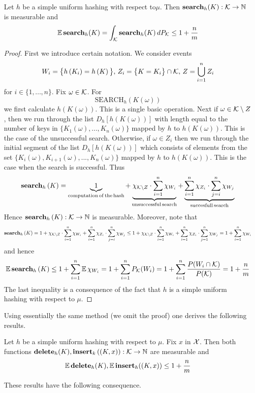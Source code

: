 \begin{theorem}\label{theorem:simple_uniform_hashing_expected_cost_for_search}
Let $h$ be a simple uniform hashing with respect to$\mu$. Then $\mathbf{search}_h(K):{\mathcal K}\rightarrow {\mathbb N}$ is measurable and
$$\mathbb{E}\,\mathbf{search}_h(K) = \int_{{\mathcal K}}\mathbf{search}_h(K)\,dP_{{\mathcal K}} \leq 1 + \frac{n}{m}$$
\end{theorem}
\begin{proof}
First we introduce certain notation. We consider events
$$W_{i} = \big\{h\left(K_i\right) = h\left(K\right)\big\},\,Z_i = \big\{K = K_i\big\}\cap {\mathcal K},\,Z = \bigcup_{i=1}^nZ_i$$
for $i\in \{1,...,n\}$. Fix $\omega \in {\mathcal K}$. For 
$$\mathrm{SEARCH}_h(K(\omega))$$
we first calculate $h(K(\omega))$. This is a single basic operation. Next if $\omega \in {\mathcal K}\setminus Z$, then we run through the list $D_h[h(K(\omega))]$ with length equal to the number of keys in $\big\{K_1(\omega),...,K_n(\omega)\big\}$ mapped by $h$ to $h(K(\omega))$. This is the case of the unsuccessful search. Otherwise, if $\omega \in Z_i$ then we run through the initial segment of the list $D_h[h(K(\omega))]$ which consists of elements from the set $\big\{K_i(\omega),K_{i+1}(\omega),...,K_n(\omega)\big\}$ mapped by $h$ to $h(K(\omega))$. This is the case when the search is successful. Thus
$$\mathbf{search}_h\left(K\right) = \underbrace{1}_{\mathrm{computation\,of\,the\,hash}} + \underbrace{\chi_{{\mathcal K}\setminus Z}\cdot\sum_{i=1}^n \chi_{W_{i}}}_{\mathrm{unsuccessful\,search}} + \underbrace{\sum_{i=1}^n\chi_{Z_i}\cdot\sum_{j = i}^n \chi_{W_{j}}}_{\mathrm{succesfull\,search}}$$
Hence $\mathbf{search}_h\left(K\right):{\mathcal K}\rightarrow {\mathbb N}$ is measurable. Moreover, note that
$$\mathbf{search}_h\left(K\right) = 1 + \chi_{{\mathcal K}\setminus Z}\cdot \sum_{i=1}^n \chi_{W_{i}} + \sum_{i=1}^n\chi_{Z_i}\cdot\sum_{j = i}^n \chi_{W_{j}} \leq 1 + \chi_{{\mathcal K}\setminus Z}\cdot \sum_{i=1}^n \chi_{W_{i}} + \sum_{i=1}^n\chi_{Z_i}\cdot\sum_{j = 1}^n \chi_{W_{j}} = 1 +  \sum_{i=1}^n \chi_{W_{i}}$$
and hence
$$\mathbb{E}\,\mathbf{search}_h\left(K\right) \leq 1 +  \sum_{i=1}^n \mathbb{E}\,\chi_{W_{i}} = 1 + \sum_{i=1}^nP_{{\mathcal K}}(W_i) = 1 + \sum_{i=1}^n\frac{P(W_i\cap {\mathcal K})}{P({\mathcal K})} = 1 + \frac{n}{m}$$
The last inequality is a consequence of the fact that $h$ is a simple uniform hashing with respect to $\mu$.
\end{proof}
\noindent
Using essentially the same method (we omit the proof) one derives the following results.

\begin{theorem}\label{theorem:simple_uniform_hashing_expected_costs_of_delete_and_insert}
Let $h$ be a simple uniform hashing with respect to $\mu$. Fix $x$ in ${\mathcal X}$. Then both functions $\mathbf{delete}_h(K),\mathbf{insert}_k\left((K,x)\right):{\mathcal K}\rightarrow {\mathbb N}$ are measurable and
$$\mathbb{E}\,\mathbf{delete}_h(K), \mathbb{E}\,\mathbf{insert}_h((K,x))  \leq 1 + \frac{n}{m}$$
\end{theorem}
\noindent
These results have the following consequence.

